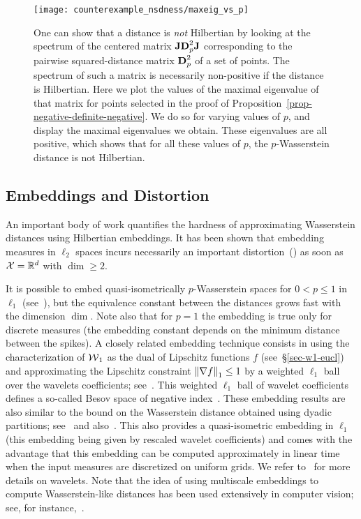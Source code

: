 \begin{figure}[h!]
\centering
\texttt{[image: counterexample\_nsdness/maxeig\_vs\_p]}
\caption{\label{fig-counterexample}
One can show that a distance is \emph{not} Hilbertian by looking at the spectrum of the centered matrix $\mathrm{\textbf{J}} \mathrm{\textbf{D}}_p^2 \mathrm{\textbf{J}}$ corresponding to the pairwise squared-distance matrix $\mathrm{\textbf{D}}_p^2$ of a set of points. The spectrum of such a matrix is necessarily non-positive if the distance is Hilbertian. Here we plot the values of the maximal eigenvalue of that matrix for points selected in the proof of Proposition~\ref{prop-negative-definite-negative}. We do so for varying values of $p$, and display the maximal eigenvalues we obtain. These eigenvalues are all positive, which shows that for all these values of $p$, the $p$-Wasserstein distance is not Hilbertian.
}
\end{figure}



\subsection{Embeddings and Distortion}

An important body of work quantifies the hardness of approximating Wasserstein distances using Hilbertian embeddings. 
%
It has been shown that embedding measures in $\ell_2$ spaces incurs necessarily an important  distortion~(\citet{naor-2005,andoni2015snowflake}) as soon as $\mathcal{X}=\mathbb{R}^d$ with $\dim\geq 2$.

It is possible to embed quasi-isometrically $p$-Wasserstein spaces for $0 < p \leq 1$ in $\ell_1$ (see~\citep{indyk,andoni2008earth,do2011sublinear}), but the equivalence constant between the distances grows fast with the dimension $\dim$. Note also that for $p=1$ the embedding is true only for discrete measures (\ie the embedding constant depends on the minimum distance between the spikes).   
%
A closely related embedding technique consists in using the characterization of $\operatorname{\mathcal{W}}_1$ as the dual of Lipschitz functions $f$ (see~\S\ref{sec-w1-eucl}) and approximating the Lipschitz constraint $\left\| \nabla f \right\|_1 \leq 1$ by a weighted $\ell_1$ ball over the wavelets coefficients; see~\citep{shirdhonkar2008approximate}. 
%
This weighted $\ell_1$ ball of wavelet coefficients defines a so-called Besov space of negative index~\citep{leeb2016holder}.
%
These embedding results are also similar to the bound on the Wasserstein distance obtained using dyadic partitions; see~\citep[Prop. 1]{weed2017sharp} and also~\citep{fournier2015rate}.
%
This also provides a quasi-isometric embedding in $\ell_1$ (this embedding being given by rescaled wavelet coefficients) and comes with the advantage that this embedding can be computed approximately in linear time when the input measures are discretized on uniform grids. We refer to~\citep{mallat2008wavelet} for more details on wavelets. Note that the idea of using multiscale embeddings to compute Wasserstein-like distances has been used extensively in computer vision; see, for instance,~\citep{ling2006diffusion,grauman2005pyramid,CuturiNIPS2006,lazebnik2006beyond}. 

